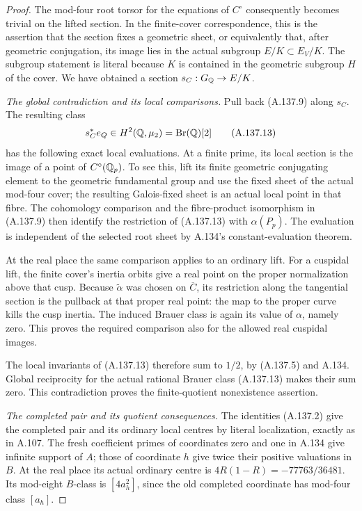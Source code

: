 \begin{proof}
The mod-four root torsor for the equations of
\(C^\circ\) consequently becomes trivial on the
lifted section.  In the finite-cover correspondence,
this is the assertion that the section fixes a
geometric sheet, or equivalently that, after geometric
conjugation, its image lies in the actual subgroup
\(E/K\subset E_V/K\).
The subgroup statement is literal because \(K\)
is contained in the geometric subgroup \(H\) of
the cover.  We have obtained a section
\(s_C:G_\mathbb Q\to E/K\).

\emph{The global contradiction and its local comparisons.}
Pull back (A.137.9) along \(s_C\).
The resulting class
\[
                    s_C^*e_Q\in H^2(\mathbb Q,\mu_2)
                                      =\operatorname{Br}(\mathbb Q)[2]
\tag{A.137.13}
\]
has the following exact local evaluations.
At a finite prime, its local section is the image
of a point of \(C^\circ(\mathbb Q_p)\).
To see this, lift its finite geometric conjugating
element to the geometric fundamental group and
use the fixed sheet of the actual mod-four cover;
the resulting Galois-fixed sheet is an actual local
point in that fibre.
The cohomology comparison and the fibre-product
isomorphism in (A.137.9) then identify the restriction
of (A.137.13) with \(\alpha(P_p)\).
The evaluation is independent of the selected root
sheet by A.134's constant-evaluation theorem.

At the real place the same comparison applies to
an ordinary lift.  For a cuspidal lift, the finite
cover's inertia orbits give a real point on the
proper normalization above that cusp.  Because
\(\widetilde\alpha\) was chosen on \(\overline C\),
its restriction along the tangential section is
the pullback at that proper real point: the map
to the proper curve kills the cusp inertia.
The induced Brauer class is again its value of
\(\alpha\), namely zero.
This proves the required comparison also for the
allowed real cuspidal images.

The local invariants of (A.137.13) therefore sum
to \(1/2\), by (A.137.5) and A.134.
Global reciprocity for the actual rational Brauer
class (A.137.13) makes their sum zero.
This contradiction proves the finite-quotient
nonexistence assertion.

\emph{The completed pair and its quotient consequences.}
The identities (A.137.2) give the completed pair
and its ordinary local centres by literal
localization, exactly as in A.107.
The fresh coefficient primes of coordinates zero
and one in A.134 give infinite support of \(A\);
those of coordinate \(h\) give twice their positive
valuations in \(B\).
At the real place its actual ordinary centre is
\(4R(1-R)=-77763/36481\).
Its mod-eight \(B\)-class is \([4a_h^2]\), since
the old completed coordinate has mod-four class
\([a_h]\).


\end{proof}

